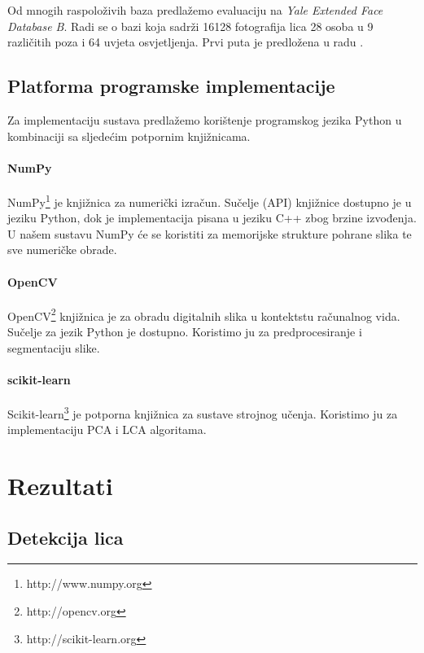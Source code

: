 \documentclass[times, utf8, seminar, numeric]{fer}
\begin{document}
Od mnogih raspoloživih baza predlažemo evaluaciju na \textit{Yale Extended Face Database B}.
Radi se o bazi koja sadrži 16128 fotografija lica 28 osoba u 9 različitih poza i 64 uvjeta
osvjetljenja. Prvi puta je predložena u radu \cite{GeBeKr01}.

\section{Platforma programske implementacije}

Za implementaciju sustava predlažemo korištenje programskog jezika Python u kombinaciji
sa sljedećim potpornim knjižnicama.

\subsubsection{NumPy}

NumPy\footnote{http://www.numpy.org} je knjižnica za numerički izračun.
Sučelje (API) knjižnice dostupno je u jeziku
Python, dok je implementacija pisana u jeziku C++ zbog brzine izvođenja.
U našem sustavu NumPy će se koristiti za memorijske strukture pohrane
slika te sve numeričke obrade.

\subsubsection{OpenCV}

OpenCV\footnote{http://opencv.org}  knjižnica
je za obradu digitalnih slika u kontektstu računalnog vida. Sučelje za
jezik Python je dostupno. Koristimo ju
za predprocesiranje i segmentaciju slike.

\subsubsection{scikit-learn}

Scikit-learn\footnote{http://scikit-learn.org} je potporna knjižnica za
sustave strojnog učenja. Koristimo ju za implementaciju PCA i LCA algoritama.

\chapter{Rezultati}

\section{Detekcija lica}
\end{document}
